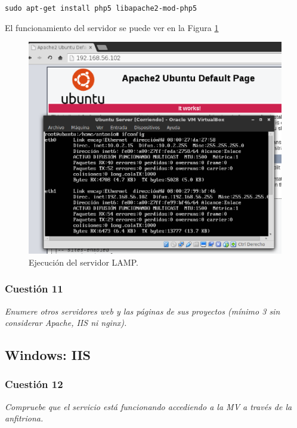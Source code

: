 \hskip3.5cm \texttt{sudo apt-get install php5 libapache2-mod-php5}

El funcionamiento del servidor se puede ver en la Figura \ref{fig17}

\begin{figure}[H]
    \begin{center}
        \includegraphics[scale=0.6]{imagenes/img17.eps}
        \caption{Ejecución del servidor LAMP.}
        \label{fig17}
    \end{center}
\end{figure}




\subsubsection{Cuestión 11}
\textit{Enumere otros servidores web y las páginas de sus proyectos (mínimo 3 sin considerar Apache, IIS ni nginx).}


\subsection{Windows: IIS}
\subsubsection{Cuestión 12}
\textit{Compruebe que el servicio está funcionando accediendo a la MV a través de la anfitriona.}


